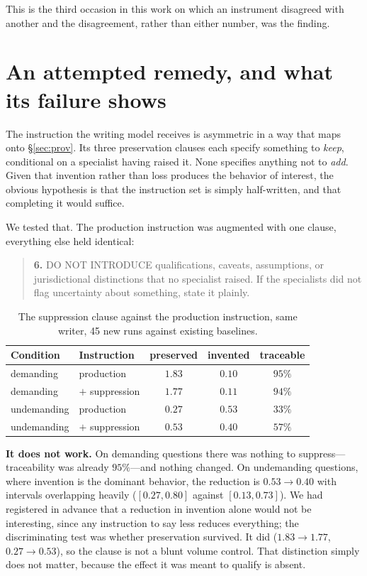 \documentclass[11pt]{article}
\begin{document}
This is the third occasion in this work on which an instrument disagreed with
another and the disagreement, rather than either number, was the finding.


\section{An attempted remedy, and what its failure shows}
\label{sec:remedy}
The instruction the writing model receives is asymmetric in a way that maps
onto \S\ref{sec:prov}. Its three preservation clauses each specify something
to \emph{keep}, conditional on a specialist having raised it. None specifies
anything not to \emph{add}. Given that invention rather than loss produces
the behavior of interest, the obvious hypothesis is that the instruction set
is simply half-written, and that completing it would suffice.

We tested that. The production instruction was augmented with one clause,
everything else held identical:

\begin{quote}\small
\textbf{6.} DO NOT INTRODUCE qualifications, caveats, assumptions, or
jurisdictional distinctions that no specialist raised. If the specialists did
not flag uncertainty about something, state it plainly.
\end{quote}

\begin{table}[t]
\centering
\caption{The suppression clause against the production instruction, same
writer, 45 new runs against existing baselines.}
\label{tab:remedy}
\begin{tabular}{llccc}
\toprule
Condition & Instruction & preserved & invented & traceable \\
\midrule
demanding & production & $1.83$ & $0.10$ & $95\%$ \\
demanding & $+$ suppression & $1.77$ & $0.11$ & $94\%$ \\
\midrule
undemanding & production & $0.27$ & $0.53$ & $33\%$ \\
undemanding & $+$ suppression & $0.53$ & $0.40$ & $57\%$ \\
\bottomrule
\end{tabular}
\end{table}

\textbf{It does not work.} On demanding questions there was nothing to
suppress---traceability was already $95\%$---and nothing changed. On
undemanding questions, where invention is the dominant behavior, the
reduction is $0.53 \rightarrow 0.40$ with intervals overlapping heavily
($[0.27,0.80]$ against $[0.13,0.73]$). We had registered in advance that a
reduction in invention alone would not be interesting, since any instruction
to say less reduces everything; the discriminating test was whether
preservation survived. It did ($1.83 \rightarrow 1.77$, $0.27 \rightarrow
0.53$), so the clause is not a blunt volume control. That distinction simply
does not matter, because the effect it was meant to qualify is absent.
\end{document}
